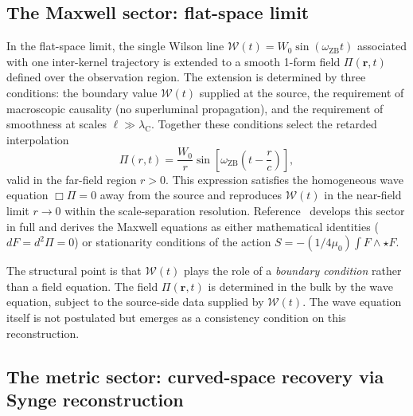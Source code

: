 \documentclass[%
 reprint, amsmath,amssymb, aps, prb, ]{revtex4-2}
\numberwithin{equation}{section}
\newcommand{\omZB}{\omega_{\text{ZB}}}
\newcommand{\WL}{\mathcal{W}}
\newcommand{\hodge}{\star}
\newcommand{\lambdaC}{\lambda_{\mathrm{C}}}
\begin{document}
\subsection{The Maxwell sector: flat-space limit}

In the flat-space limit, the single Wilson line $\WL(t) = W_0 \sin(\omZB t)$ associated with one inter-kernel trajectory is extended to a smooth 1-form field $\Pi(\mathbf{r},t)$ defined over the observation region. The extension is determined by three conditions: the boundary value $\WL(t)$ supplied at the source, the requirement of macroscopic causality (no superluminal propagation), and the requirement of smoothness at scales $\ell \gg \lambdaC$. Together these conditions select the retarded interpolation
\begin{equation}
\Pi(r,t) = \frac{W_0}{r} \sin\!\left[\omZB\!\left(t - \frac{r}{c}\right)\right],
\label{eq:retarded}
\end{equation}
valid in the far-field region $r > 0$. This expression satisfies the homogeneous wave equation $\Box \Pi = 0$ away from the source and reproduces $\WL(t)$ in the near-field limit $r \to 0$ within the scale-separation resolution. Reference~\cite{hanamura54} develops this sector in full and derives the Maxwell equations as either mathematical identities ($dF = d^2\Pi = 0$) or stationarity conditions of the action $S = -(1/4\mu_0)\int F \wedge \hodge F$.

The structural point is that $\WL(t)$ plays the role of a \emph{boundary condition} rather than a field equation. The field $\Pi(\mathbf{r},t)$ is determined in the bulk by the wave equation, subject to the source-side data supplied by $\WL(t)$. The wave equation itself is not postulated but emerges as a consistency condition on this reconstruction.

\subsection{The metric sector: curved-space recovery via Synge reconstruction}
\end{document}
